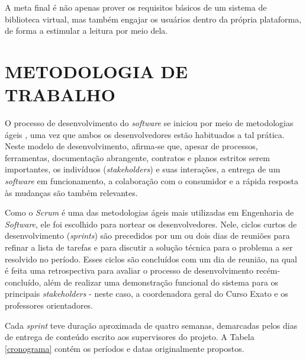 \documentclass[a4paper]{article}
\begin{document}
A meta final é não apenas prover os requisitos básicos de um sistema de biblioteca virtual, mas também engajar os usuários dentro da própria plataforma, de forma a estimular a leitura por meio dela.



\section{METODOLOGIA DE TRABALHO}
O processo de desenvolvimento do \textit{software} se iniciou por meio de metodologias ágeis \cite{manifesto}, uma vez que ambos os desenvolvedores estão habituados a tal prática. Neste modelo de desenvolvimento, afirma-se que, apesar de processos, ferramentas, documentação abrangente, contratos e planos estritos serem importantes, os indivíduos (\textit{stakeholders}) e suas interações, a entrega de um \textit{software} em funcionamento, a colaboração com o consumidor e a rápida resposta às mudanças são também relevantes.

Como o \textit{Scrum} \cite{scrum} é uma das metodologias ágeis mais utilizadas em Engenharia de \textit{Software}, ele foi escolhido para nortear os desenvolvedores. Nele, ciclos curtos de desenvolvimento (\textit{sprints}) são precedidos por um ou dois dias de reuniões para refinar a lista de tarefas e para discutir a solução técnica para o problema a ser resolvido no período. Esses ciclos são concluídos com um dia de reunião, na qual é feita uma retrospectiva para avaliar o processo de desenvolvimento recém-concluído, além de realizar uma demonstração funcional do sistema para os principais \textit{stakeholders} - neste caso, a coordenadora geral do Curso Exato e os professores orientadores.

Cada \textit{sprint} teve duração aproximada de quatro semanas, demarcadas pelos dias de entrega de conteúdo escrito aos supervisores do projeto. A Tabela \ref{cronograma} contém os períodos e datas originalmente propostos.
\end{document}
